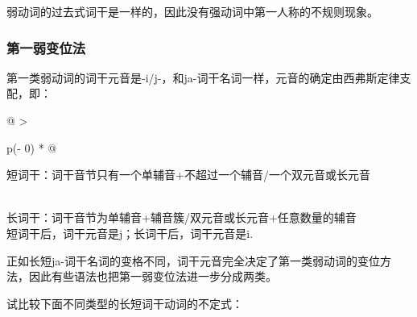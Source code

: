 弱动词的过去式词干是一样的，因此没有强动词中第一人称的不规则现象。

\subsubsection{第一弱变位法}\label{ux7b2cux4e00ux5f31ux53d8ux4f4dux6cd5}

第一类弱动词的词干元音是-i/j-，和ja-词干名词一样，元音的确定由西弗斯定律支配，即：

\begin{longtable}[]{@{}
  >{\raggedright\arraybackslash}p{(\columnwidth - 0\tabcolsep) * }@{}}
  \toprule\noalign{}
  \begin{minipage}[b]{\linewidth}\raggedright
    短词干：词干音节只有一个单辅音+不超过一个辅音/一个双元音或长元音
  \end{minipage} \\
  \midrule\noalign{}
  \endhead
  \bottomrule\noalign{}
  \endlastfoot
  长词干：词干音节为单辅音+辅音簇/双元音或长元音+任意数量的辅音   \\
  短词干后，词干元音是j；长词干后，词干元音是i.                   \\
\end{longtable}

正如长短ja-词干名词的变格不同，词干元音完全决定了第一类弱动词的变位方法，因此有些语法也把第一弱变位法进一步分成两类。

试比较下面不同类型的长短词干动词的不定式：

